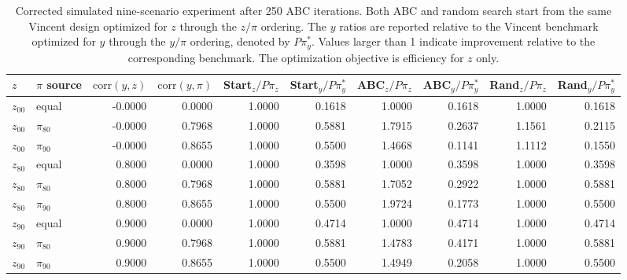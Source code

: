 \begin{table}[!htbp]
\centering
\small
\caption{Corrected simulated nine-scenario experiment after 250 ABC iterations. Both ABC and random search start from the same Vincent design optimized for $z$ through the $z/\pi$ ordering. The $y$ ratios are reported relative to the Vincent benchmark optimized for $y$ through the $y/\pi$ ordering, denoted by $P\pi_y^*$. Values larger than 1 indicate improvement relative to the corresponding benchmark. The optimization objective is efficiency for $z$ only.}
\label{tab:abc-random-simulated-effz-250-corrected}
\begin{tabular}{llrrrrrrrr}
\hline
$z$ & $\pi$ source & $\mathrm{corr}(y,z)$ & $\mathrm{corr}(y,\pi)$ & Start$_z/P\pi_z$ & Start$_y/P\pi_y^*$ & ABC$_z/P\pi_z$ & ABC$_y/P\pi_y^*$ & Rand$_z/P\pi_z$ & Rand$_y/P\pi_y^*$ \\
\hline
$z_{00}$ & equal & -0.0000 & 0.0000 & 1.0000 & 0.1618 & 1.0000 & 0.1618 & 1.0000 & 0.1618 \\
$z_{00}$ & $\pi_{80}$ & -0.0000 & 0.7968 & 1.0000 & 0.5881 & 1.7915 & 0.2637 & 1.1561 & 0.2115 \\
$z_{00}$ & $\pi_{90}$ & -0.0000 & 0.8655 & 1.0000 & 0.5500 & 1.4668 & 0.1141 & 1.1112 & 0.1550 \\
$z_{80}$ & equal & 0.8000 & 0.0000 & 1.0000 & 0.3598 & 1.0000 & 0.3598 & 1.0000 & 0.3598 \\
$z_{80}$ & $\pi_{80}$ & 0.8000 & 0.7968 & 1.0000 & 0.5881 & 1.7052 & 0.2922 & 1.0000 & 0.5881 \\
$z_{80}$ & $\pi_{90}$ & 0.8000 & 0.8655 & 1.0000 & 0.5500 & 1.9724 & 0.1773 & 1.0000 & 0.5500 \\
$z_{90}$ & equal & 0.9000 & 0.0000 & 1.0000 & 0.4714 & 1.0000 & 0.4714 & 1.0000 & 0.4714 \\
$z_{90}$ & $\pi_{80}$ & 0.9000 & 0.7968 & 1.0000 & 0.5881 & 1.4783 & 0.4171 & 1.0000 & 0.5881 \\
$z_{90}$ & $\pi_{90}$ & 0.9000 & 0.8655 & 1.0000 & 0.5500 & 1.4949 & 0.2058 & 1.0000 & 0.5500 \\
\hline
\end{tabular}
\end{table}
